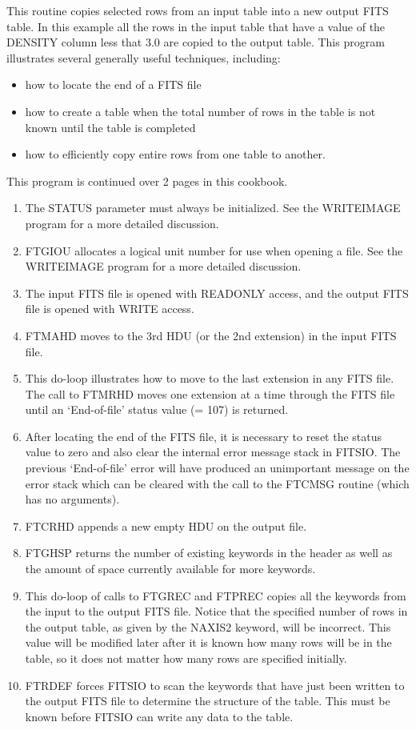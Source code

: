 This routine copies selected rows from an input table into a new output
FITS table.  In this example all the rows in the input table that have
a value of the DENSITY column less that 3.0 are copied to the output
table.  This program illustrates several generally useful techniques,
including:
\begin{itemize}
\item
how to locate the end of a FITS file
\item
how to create a table when the total number of rows in the table
is not known until the table is completed
\item
how to efficiently copy entire rows from one table to another.
\end{itemize}
This program is continued over 2 pages in this cookbook.
\begin{enumerate}
\item
The STATUS parameter must always be initialized.  See the WRITEIMAGE 
program for a more detailed discussion.
\item
FTGIOU allocates a logical unit number for use when opening a file.
See the WRITEIMAGE program for a more detailed discussion.
\item
The input FITS file is opened with READONLY access, and the output
FITS file is opened with WRITE access.
\item
FTMAHD moves to the 3rd HDU (or the 2nd extension) in the input FITS file.
\item
This do-loop illustrates how to move to the last extension in any FITS
file.  The call to FTMRHD moves one extension at a time through the
FITS file until an `End-of-file' status value (= 107) is returned.
\item
After locating the end of the FITS file, it is necessary to reset the
status value to zero and also clear the internal error message stack
in FITSIO.  The previous `End-of-file' error will have produced
an unimportant message on the error stack which can be cleared with
the call to the FTCMSG routine (which has no arguments).
\item
FTCRHD appends a new empty HDU on the output file.
\item
FTGHSP returns the number of existing keywords in the header as well as
the amount of space currently available for more keywords.
\item
This do-loop of calls to FTGREC and FTPREC copies all the keywords from
the input to the output FITS file.  Notice that the specified number
of rows in the output table, as given by the NAXIS2 keyword, will be
incorrect.  This value will be modified later after it is known how many
rows will be in the table, so it does not matter how many rows are specified
initially.
\item
FTRDEF forces FITSIO to scan the keywords that have just been written
to the output FITS file to determine the structure of the table.
This must be known before FITSIO can write any data to the table.
\end{enumerate}

